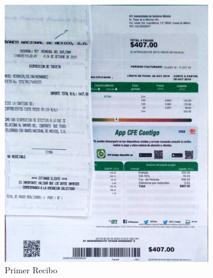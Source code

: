 \documentclass[]{article}
\begin{document}
\begin{figure}[h!]
	\centering
	\begin{subfigure}[b]{0.45\textwidth}
		\includegraphics[width=\textwidth]{CFE1}
		\caption{Primer Recibo}
		\label{fig:CFE1}
	\end{subfigure}
	~ %
	\begin{subfigure}[b]{0.45\textwidth}

\end{subfigure}
\end{figure}
\end{document}
